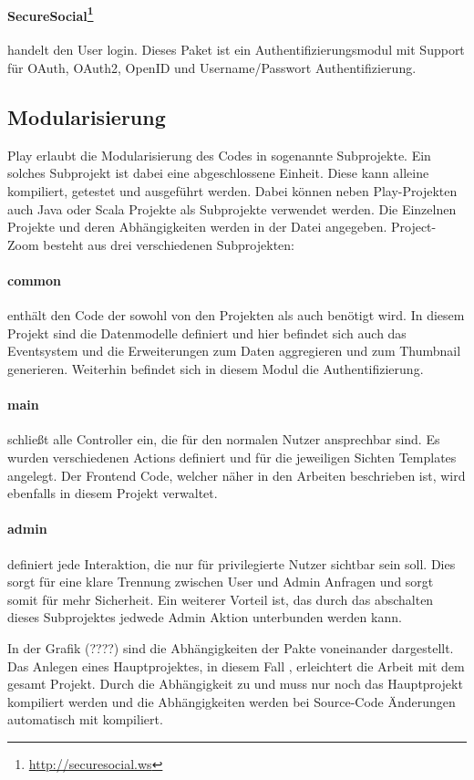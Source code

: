 \paragraph{SecureSocial\footnote{\url{http://securesocial.ws}}} handelt den User login. Dieses Paket ist ein Authentifizierungsmodul mit Support für OAuth, OAuth2, OpenID und Username/Passwort Authentifizierung. 

\subsection{Modularisierung}
Play erlaubt die Modularisierung des Codes in sogenannte Subprojekte. Ein solches Subprojekt ist dabei eine abgeschlossene Einheit. Diese kann alleine kompiliert, getestet und ausgeführt werden. Dabei können neben Play-Projekten auch Java oder Scala Projekte als Subprojekte verwendet werden. Die Einzelnen Projekte und deren Abhängigkeiten werden in der  Datei angegeben.
Project-Zoom besteht aus drei verschiedenen Subprojekten:

\paragraph{common} enthält den Code der sowohl von den Projekten  als auch  benötigt wird. In diesem Projekt sind die Datenmodelle definiert und hier befindet sich auch das Eventsystem und die Erweiterungen zum Daten aggregieren und zum Thumbnail generieren. Weiterhin befindet sich in diesem Modul die Authentifizierung.

\paragraph{main} schließt alle Controller ein, die für den normalen Nutzer ansprechbar sind. Es wurden verschiedenen Actions definiert und für die jeweiligen Sichten Templates angelegt. Der Frontend Code, welcher näher in den Arbeiten \cite{bp-norman, bp-tomh, bp-anita} beschrieben ist, wird ebenfalls in diesem Projekt verwaltet.

\paragraph{admin} definiert jede Interaktion, die nur 
für privilegierte Nutzer sichtbar sein soll. Dies sorgt für eine klare Trennung zwischen User und Admin Anfragen und sorgt somit für mehr Sicherheit. Ein weiterer Vorteil ist, das durch das abschalten dieses Subprojektes jedwede Admin Aktion unterbunden werden kann.

In der Grafik (????) sind die Abhängigkeiten der Pakte voneinander dargestellt. Das Anlegen eines Hauptprojektes, in diesem Fall , erleichtert die Arbeit mit dem gesamt Projekt. Durch die Abhängigkeit zu  und  muss nur noch das Hauptprojekt kompiliert werden und die Abhängigkeiten werden bei Source-Code Änderungen automatisch mit kompiliert.
